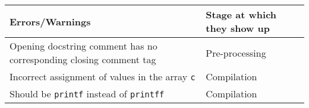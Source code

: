 \begin{tabular}{p{} p{}}
    \toprule
    \textbf{Errors/Warnings}
     &
    \textbf{Stage at which they show up}
    \\
    \midrule
    Opening docstring comment has no corresponding closing comment tag
     &
    Pre-processing
    \\
    \midrule
    Incorrect assignment of values in the array \texttt{c}
     &
    Compilation
    \\
    \midrule
    Should be \texttt{printf} instead of \texttt{printff}
     &
    Compilation
    \\
    \bottomrule
\end{tabular}
